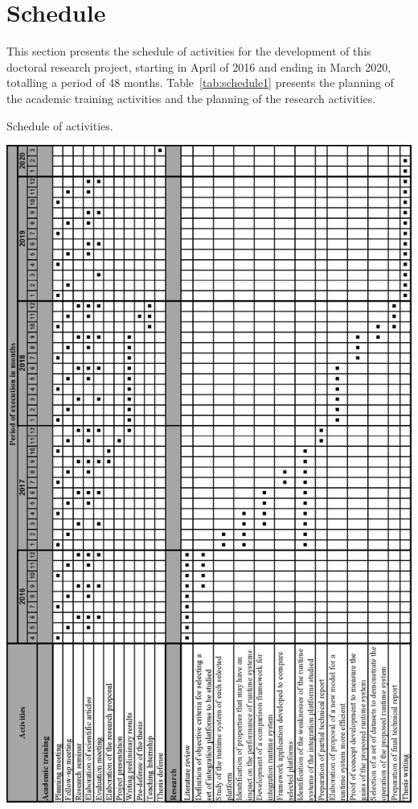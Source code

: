 \section{Schedule}
\label{sec:schedule}

\noindent 

This section presents the schedule of activities for the development of this doctoral research project, starting in April of 2016 and ending in March 2020, totalling a period of 48 months.
Table~\ref{tab:schedule1} presents the planning of the academic training activities and the planning of the research activities.

\begin{table}[htbp]
	\centering
	\caption{Schedule of activities.}
    \includegraphics[scale=0.8]{./figs/chrono.eps}
	\label{tab:schedule1}
\end{table}